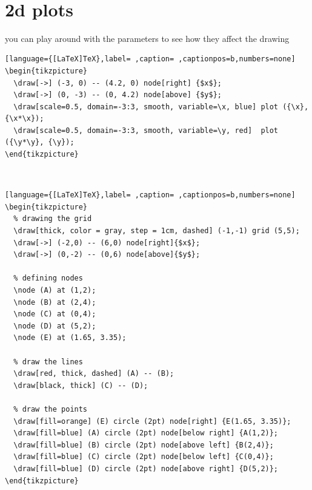 \documentclass[a4paper,12pt]{article}
\begin{document}
\\[0pt]

\section{2d plots}
\label{sec:org04ec3f5}
you can play around with the parameters to see how they affect the drawing\\[0pt]
\begin{lstlisting}[language={[LaTeX]TeX},label= ,caption= ,captionpos=b,numbers=none]
\begin{tikzpicture}
  \draw[->] (-3, 0) -- (4.2, 0) node[right] {$x$};
  \draw[->] (0, -3) -- (0, 4.2) node[above] {$y$};
  \draw[scale=0.5, domain=-3:3, smooth, variable=\x, blue] plot ({\x}, {\x*\x});
  \draw[scale=0.5, domain=-3:3, smooth, variable=\y, red]  plot ({\y*\y}, {\y});
\end{tikzpicture}
\end{lstlisting}

\\[0pt]

\begin{lstlisting}[language={[LaTeX]TeX},label= ,caption= ,captionpos=b,numbers=none]
\begin{tikzpicture}
  % drawing the grid
  \draw[thick, color = gray, step = 1cm, dashed] (-1,-1) grid (5,5);
  \draw[->] (-2,0) -- (6,0) node[right]{$x$};
  \draw[->] (0,-2) -- (0,6) node[above]{$y$};

  % defining nodes
  \node (A) at (1,2);
  \node (B) at (2,4);
  \node (C) at (0,4);
  \node (D) at (5,2);
  \node (E) at (1.65, 3.35);

  % draw the lines
  \draw[red, thick, dashed] (A) -- (B);
  \draw[black, thick] (C) -- (D);

  % draw the points
  \draw[fill=orange] (E) circle (2pt) node[right] {E(1.65, 3.35)};
  \draw[fill=blue] (A) circle (2pt) node[below right] {A(1,2)};
  \draw[fill=blue] (B) circle (2pt) node[above left] {B(2,4)};
  \draw[fill=blue] (C) circle (2pt) node[below left] {C(0,4)};
  \draw[fill=blue] (D) circle (2pt) node[above right] {D(5,2)};
\end{tikzpicture}
\end{lstlisting}

\\[0pt]
\end{document}
